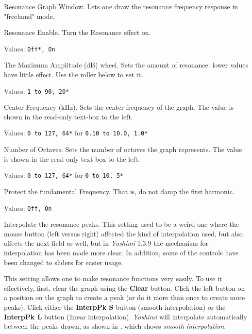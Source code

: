    \setcounter{ItemCounter}{0}      %

   Resonance Graph Window.
   Lets one draw the resonance frequency response in "freehand" mode.

   Resonance Enable.
   Turn the Resonance effect on.

   Values: \texttt{Off*, On}

   The Maximum Amplitude (dB) wheel.
   Sets the amount of resonance: lower values have little effect. Use the
   roller below to set it.

   Values: \texttt{1 to 90, 20*}

   Center Frequency (kHz).
   Sets the center frequency of the graph.
   The value is shown in the read-only text-box to the left.

   Values: \texttt{0 to 127, 64*} for \texttt{0.10 to 10.0, 1.0*}

   Number of Octaves.
   Sets the number of octaves the graph represents.
   The value is shown in the read-only text-box to the left.

   Values: \texttt{0 to 127, 64*} for \texttt{0 to 10, 5*}

   Protect the fundamental Frequency.
   That is, do not damp the first harmonic.

   Values: \texttt{Off, On}

   Interpolate the resonance peaks.
   This setting used to be a weird one where the mouse button (left versus
   right) affected the kind of interpolation used,
   but also affects the next field as well, but in \textsl{Yoshimi} 1.3.9 the
   mechanism for interpolation has been made more clear.
   In addition, some of the controls have been changed to sliders for easier
   usage.

   This setting allows one to make resonance functions very easily.  To use
   it effectively, first, clear the graph using the \textbf{Clear} button.
   Click the left button on a position on the graph to create a peak (or do it
   more than once to create more peaks). Click either the
   \textbf{InterpPk S} button (smooth interpolation)
   or the \textbf{InterpPk L} button (linear interpolation).
   \textsl{Yoshimi} will interpolate automatically between the
   peaks drawn,
   as shown in ,
   which shows \textsl{smooth interpolation}.

